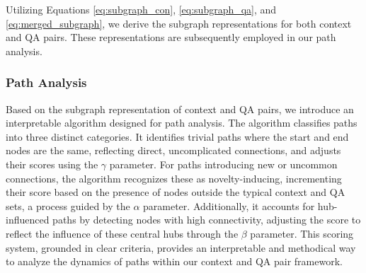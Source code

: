 \documentclass[11pt]{article}
\begin{document}
Utilizing Equations \ref{eq:subgraph_con}, \ref{eq:subgraph_qa}, and \ref{eq:merged_subgraph}, we derive the subgraph representations for both context and QA pairs. These representations are subsequently employed in our path analysis.



\subsubsection{Path Analysis}



Based on the subgraph representation of context and QA pairs, we introduce an interpretable algorithm designed for path analysis. The algorithm classifies paths into three distinct categories. It identifies trivial paths where the start and end nodes are the same, reflecting direct, uncomplicated connections, and adjusts their scores using the $\gamma$ parameter. For paths introducing new or uncommon connections, the algorithm recognizes these as novelty-inducing, incrementing their score based on the presence of nodes outside the typical context and QA sets, a process guided by the $\alpha$ parameter. Additionally, it accounts for hub-influenced paths by detecting nodes with high connectivity, adjusting the score to reflect the influence of these central hubs through the $\beta$ parameter. This scoring system, grounded in clear criteria, provides an interpretable and methodical way to analyze the dynamics of paths within our context and QA pair framework.


\end{document}
